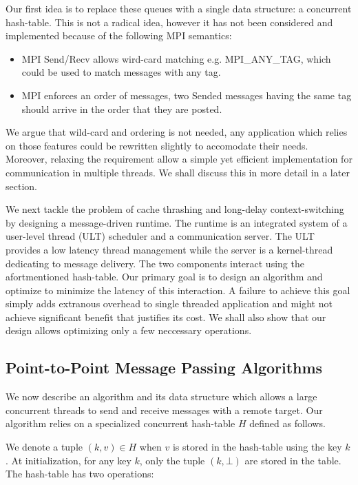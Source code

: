 \documentclass[11pt]{article}
\begin{document}
Our first idea is to replace these queues with a single data structure: a
concurrent hash-table. This is not a radical idea, however it has not been
considered and implemented because of the following MPI semantics:

\begin{itemize}
  \item MPI Send/Recv allows wird-card matching e.g. MPI\_ANY\_TAG, which could
    be used to match messages with any tag.
  \item MPI enforces an order of messages, two Sended messages having the same
    tag should arrive in the order that they are posted.
\end{itemize}

We argue that wild-card and ordering is not needed, any application which
relies on those features could be rewritten slightly to accomodate their needs.
Moreover, relaxing the requirement allow a simple yet efficient implementation
for communication in multiple threads. We shall discuss this in more detail
in a later section.

We next tackle the problem of cache thrashing and long-delay context-switching
by designing a message-driven runtime. The runtime is an integrated system of a
user-level thread (ULT) scheduler and a communication server. The ULT provides
a low latency thread management while the server is a kernel-thread dedicating
to message delivery. The two components interact using the afortmentioned
hash-table.  Our primary goal is to design an algorithm and optimize to
minimize the latency of this interaction. A failure to achieve this goal simply
adds extranous overhead to single threaded application and might not achieve
significant benefit that justifies its cost. We shall also show that our design 
allows optimizing only a few neccessary operations.

\subsection{Point-to-Point Message Passing Algorithms}
We now describe an algorithm and its data structure which allows a large
concurrent threads to send and receive messages with a remote target. Our
algorithm relies on a specialized concurrent hash-table $H$ defined as follows.

We denote a tuple $(k,v) \in H$ when $v$ is stored in the hash-table using the
key $k$. At initialization, for any key $k$, only the tuple $(k,\bot)$ are
stored in the table. The hash-table has two operations: 
\end{document}
